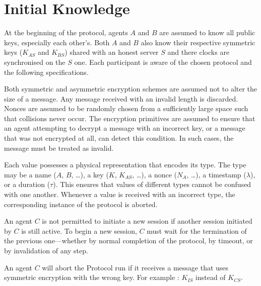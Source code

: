 \section{Initial Knowledge}
At the beginning of the protocol, agents $A$ and $B$ are assumed to know all public keys, especially each other’s.
Both $A$ and $B$ also know their respective symmetric keys ($K_{AS}$ and $K_{BS}$) shared with an honest server $S$
and there clocks are synchronised on the $S$ one. 
Each participant is aware of the chosen protocol and the following specifications.

Both symmetric and asymmetric encryption schemes are assumed not to alter the size of a message.
Any message received with an invalid length is discarded.
Nonces are assumed to be randomly chosen from a sufficiently large space such that collisions never occur.
The encryption primitives are assumed to ensure that an agent attempting to decrypt a message with an incorrect key, or a message that was not encrypted at all, can detect this condition.
In such cases, the message must be treated as invalid.

Each value possesses a physical representation that encodes its type.
The type may be a name ($A$, $B$, …), a key ($K$, $K_{AS}$, …), a nonce ($N_{A}$, …), a timestamp ($\lambda$), or a duration ($\tau$).
This ensures that values of different types cannot be confused with one another.
Whenever a value is received with an incorrect type, the corresponding instance of the protocol is aborted.

An agent $C$ is not permitted to initiate a new session if another session initiated by $C$ is still active.
To begin a new session, $C$ must wait for the termination of the previous one—whether by normal completion of the protocol, by timeout, or by invalidation of any step.

An agent $C$ will abort the Protocol run if it receives a message that uses symmetric encryption with the wrong key. For example : $K_{IS}$ instead of $K_{CS}$.
